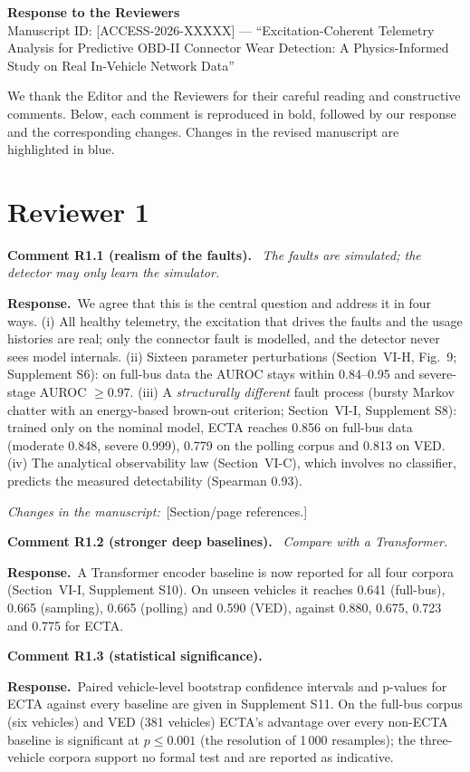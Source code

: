 \documentclass[11pt]{article}
\newcommand{\rc}[1]{\par\medskip\noindent\textbf{Comment #1.}\ }
\newcommand{\resp}{\par\noindent\textcolor{blue!60!black}{\textbf{Response.}}\ }
\newcommand{\chg}{\par\noindent\textit{Changes in the manuscript:}\ }
\begin{document}
\begin{center}
{\large\bfseries Response to the Reviewers}\\[2pt]
Manuscript ID: [ACCESS-2026-XXXXX] --- ``Excitation-Coherent Telemetry Analysis for Predictive
OBD-II Connector Wear Detection: A Physics-Informed Study on Real In-Vehicle Network Data''
\end{center}

We thank the Editor and the Reviewers for their careful reading and constructive comments. Below,
each comment is reproduced in bold, followed by our response and the corresponding changes.
Changes in the revised manuscript are highlighted in blue.

\section*{Reviewer 1}

\rc{R1.1 (realism of the faults)} \emph{The faults are simulated; the detector may only learn the simulator.}
\resp We agree that this is the central question and address it in four ways. (i) All healthy
telemetry, the excitation that drives the faults and the usage histories are real; only the
connector fault is modelled, and the detector never sees model internals. (ii) Sixteen parameter
perturbations (Section~VI-H, Fig.~9; Supplement S6): on full-bus data the AUROC stays within
0.84--0.95 and severe-stage AUROC $\ge 0.97$. (iii) A \emph{structurally different} fault process
(bursty Markov chatter with an energy-based brown-out criterion; Section~VI-I, Supplement S8):
trained only on the nominal model, ECTA reaches 0.856 on full-bus data (moderate 0.848, severe
0.999), 0.779 on the polling corpus and 0.813 on VED. (iv) The analytical observability law
(Section~VI-C), which involves no classifier, predicts the measured detectability (Spearman 0.93).
\chg [Section/page references.]

\rc{R1.2 (stronger deep baselines)} \emph{Compare with a Transformer.}
\resp A Transformer encoder baseline is now reported for all four corpora (Section~VI-I,
Supplement S10). On unseen vehicles it reaches 0.641 (full-bus), 0.665 (sampling), 0.665 (polling)
and 0.590 (VED), against 0.880, 0.675, 0.723 and 0.775 for ECTA.

\rc{R1.3 (statistical significance)}
\resp Paired vehicle-level bootstrap confidence intervals and p-values for ECTA against every
baseline are given in Supplement S11. On the full-bus corpus (six vehicles) and VED (381 vehicles)
ECTA's advantage over every non-ECTA baseline is significant at $p\le0.001$ (the resolution of
1\,000 resamples); the three-vehicle corpora support no formal test and are reported as indicative.
\end{document}
